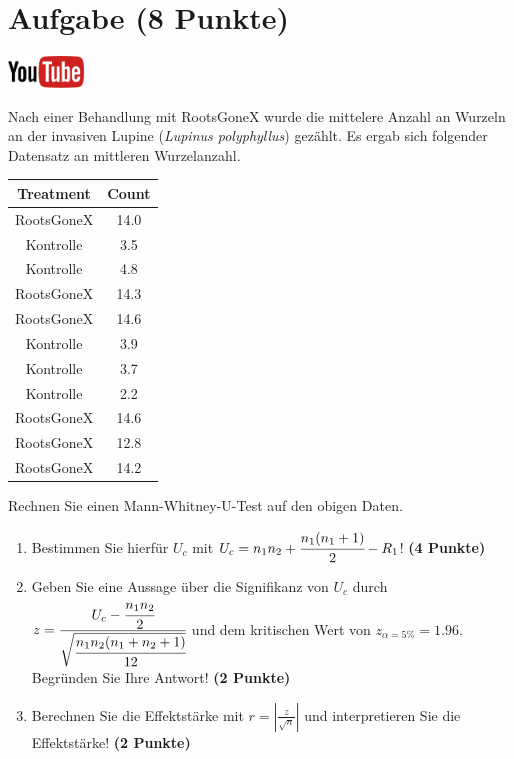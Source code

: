 \documentclass[a4paper, 10pt]{scrartcl}\usepackage[]{graphicx}\usepackage[]{xcolor}
\newenvironment{knitrout}{}{} %
\begin{document}
\section{Aufgabe \hfill (8 Punkte)}

\hfill\href{https://youtu.be/5tiJFxuZcco}{\includegraphics[width =
  2cm]{img/youtube}} %
\hspace{2Ex}




Nach einer Behandlung mit RootsGoneX wurde die mittelere Anzahl an Wurzeln
an der invasiven Lupine (\textit{Lupinus polyphyllus}) gez{\"a}hlt. Es ergab sich
folgender Datensatz an mittleren Wurzelanzahl.

\begin{knitrout}
\color{fgcolor}\begin{table}[!h]
\centering
\begin{tabular}{cc}
\toprule
Treatment & Count\\
\midrule
RootsGoneX & 14.0\\
Kontrolle & 3.5\\
Kontrolle & 4.8\\
RootsGoneX & 14.3\\
RootsGoneX & 14.6\\
\addlinespace
Kontrolle & 3.9\\
Kontrolle & 3.7\\
Kontrolle & 2.2\\
RootsGoneX & 14.6\\
RootsGoneX & 12.8\\
\addlinespace
RootsGoneX & 14.2\\
\bottomrule
\end{tabular}
\end{table}

\end{knitrout}

Rechnen Sie einen Mann-Whitney-U-Test auf den obigen Daten.

\begin{enumerate}
\item Bestimmen Sie hierf{\"u}r $U_c$ mit $U_c = n_1n_2 +
  \cfrac{n_1(n_1+1)}{2}-R_1$! \textbf{(4 Punkte)} 
\item Geben Sie eine Aussage {\"u}ber die Signifikanz von $U_c$ durch
  $z = \cfrac{U_c -
    \cfrac{n_1n_2}{2}}{\sqrt{\cfrac{n_1n_2(n_1+n_2+1)}{12}}}$ und dem
  kritischen Wert von $z_{\alpha = 5\%} = 1.96$. Begr{\"u}nden Sie Ihre
  Antwort! \textbf{(2 Punkte)}
\item Berechnen Sie die Effektst{\"a}rke mit $r = |\frac{z}{\sqrt{n}}| $ und
  interpretieren Sie die Effektst{\"a}rke! \textbf{(2 Punkte)} 
\end{enumerate} 
\clearpage
\end{document}
